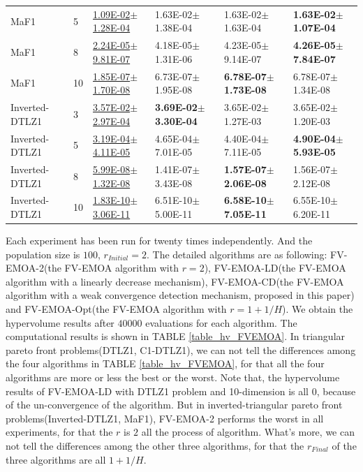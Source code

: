 \documentclass[conference]{IEEEtran}
\begin{document}
\begin{table}[!t]
\begin{tabular*}{\textwidth}{l|l|m{3.5cm}m{3.5cm}m{3.5cm}m{3.5cm}}
    MaF1            & 5  & \underline{1.09E-02$\pm$1.28E-04} & 1.63E-02$\pm$1.38E-04             & 1.63E-02$\pm$1.63E-04             & \textbf{1.63E-02$\pm$1.07E-04} \\
    MaF1            & 8  & \underline{2.24E-05$\pm$9.81E-07} & 4.18E-05$\pm$1.31E-06             & 4.23E-05$\pm$9.14E-07             & \textbf{4.26E-05$\pm$7.84E-07} \\
    MaF1            & 10 & \underline{1.85E-07$\pm$1.70E-08} & 6.73E-07$\pm$1.95E-08             & \textbf{6.78E-07$\pm$1.73E-08}    & 6.78E-07$\pm$1.34E-08 \\ 
    \hline
    Inverted-DTLZ1  & 3  & \underline{3.57E-02$\pm$2.97E-04} & \textbf{3.69E-02$\pm$3.30E-04}    & 3.65E-02$\pm$1.27E-03             & 3.65E-02$\pm$1.20E-03 \\
    Inverted-DTLZ1  & 5  & \underline{3.19E-04$\pm$4.11E-05} & 4.65E-04$\pm$7.01E-05             & 4.40E-04$\pm$7.11E-05             & \textbf{4.90E-04$\pm$5.93E-05} \\
    Inverted-DTLZ1  & 8  & \underline{5.99E-08$\pm$1.32E-08} & 1.41E-07$\pm$3.43E-08             & \textbf{1.57E-07$\pm$2.06E-08}    & 1.56E-07$\pm$2.12E-08 \\
    Inverted-DTLZ1  & 10 & \underline{1.83E-10$\pm$3.06E-11} & 6.51E-10$\pm$5.00E-11             & \textbf{6.58E-10$\pm$7.05E-11}    & 6.55E-10$\pm$6.20E-11 \\ 
    \hline
  \end{tabular*}
\end{table}
Each experiment has been run for twenty times independently. 
And the population size is $100$, $r_{Initial}=2$.
The detailed algorithms are as following: 
FV-EMOA-2(the FV-EMOA\cite{FVEMOA} algorithm with $r=2$),
FV-EMOA-LD(the FV-EMOA algorithm with a linearly decrease mechanism),
FV-EMOA-CD(the FV-EMOA algorithm with a weak convergence detection mechanism, proposed in this paper)
and FV-EMOA-Opt(the FV-EMOA algorithm with $r=1+1/H$).
We obtain the hypervolume results after $40000$ evaluations for each algorithm. 
The computational results is shown in TABLE \ref{table_hv_FVEMOA}.%
In triangular pareto front problems(DTLZ1, C1-DTLZ1), 
we can not tell the differences among the four algorithms in TABLE \ref{table_hv_FVEMOA},
for that all the four algorithms are more or less the best or the worst. 
Note that, the hypervolume results of FV-EMOA-LD with DTLZ1 problem and 10-dimension is all 0,
because of the un-convergence of the algorithm.
But in inverted-triangular pareto front problems(Inverted-DTLZ1, MaF1), 
FV-EMOA-2 performs the worst in all experiments,
for that the $r$ is $2$ all the process of algorithm. 
What's more, we can not tell the differences among the other three algorithms, 
for that the $r_{Final}$ of the three algorithms are all $1+1/H$.
\end{document}
